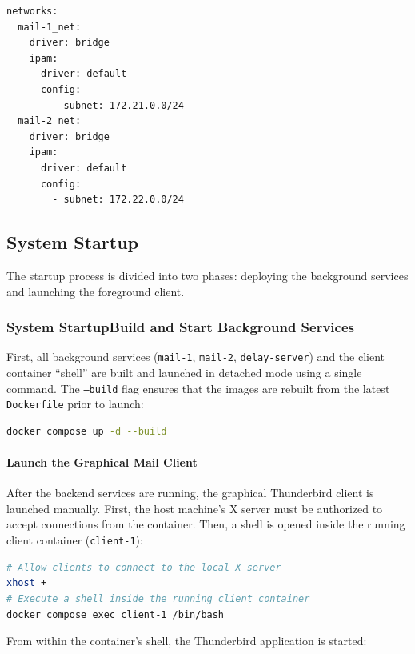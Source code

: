 \begin{lstlisting}[caption={docker-compose.yml: network definitions}]
networks:
  mail-1_net:
    driver: bridge
    ipam:
      driver: default
      config:
        - subnet: 172.21.0.0/24
  mail-2_net:
    driver: bridge
    ipam:
      driver: default
      config:
        - subnet: 172.22.0.0/24
\end{lstlisting}

\subsection*{System Startup}
The startup process is divided into two phases: deploying the background services and launching the foreground client.

\subsubsection*{System StartupBuild and Start Background Services}
First, all background services (\texttt{mail-1}, \texttt{mail-2}, \texttt{delay-server}) and the client container ``shell'' are built and launched in detached mode using a single command.  
The \texttt{--build} flag ensures that the images are rebuilt from the latest \texttt{Dockerfile} prior to launch:

\begin{lstlisting}[language=bash,caption={Building and launching background services}]
docker compose up -d --build
\end{lstlisting}

\paragraph{Launch the Graphical Mail Client}
After the backend services are running, the graphical Thunderbird client is launched manually.  
First, the host machine's X server must be authorized to accept connections from the container.  
Then, a shell is opened inside the running client container (\texttt{client-1}):

\begin{lstlisting}[language=bash,caption={Authorizing X server and opening client container shell}]
# Allow clients to connect to the local X server
xhost +
# Execute a shell inside the running client container
docker compose exec client-1 /bin/bash
\end{lstlisting}

From within the container's shell, the Thunderbird application is started:

